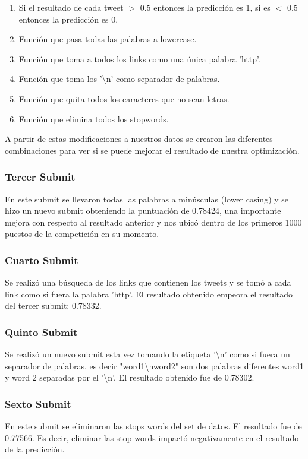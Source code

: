 \documentclass[12pt]{article}
\begin{document}
\begin{enumerate}
  \item Si el resultado de cada tweet $>$ 0.5 entonces la predicción es 1, si es $<$ 0.5 entonces la predicción es 0.
  \item Función que pasa todas las palabras a lowercase.
  \item Función que toma a todos los links como una única palabra 'http'.
  \item Función que toma los '\textbackslash n' como separador de palabras.
  \item Función que quita todos los caracteres que no sean letras.
  \item Función que elimina todos los stopwords.
\end{enumerate}
A partir de estas modificaciones a nuestros datos se crearon las diferentes combinaciones para ver si se puede mejorar el resultado de nuestra optimización.

\subsubsection{Tercer Submit}
En este submit se llevaron todas las palabras a minúsculas (lower casing) y se hizo un nuevo submit obteniendo la puntuación de 0.78424, una importante mejora con respecto al resultado anterior y nos ubicó dentro de los primeros 1000 puestos de la competición en su momento.


\subsubsection{Cuarto Submit}
Se realizó una búsqueda de los links que contienen los tweets y se tomó a cada link como si fuera la palabra 'http'. El resultado obtenido empeora el resultado del tercer submit: 0.78332.


\subsubsection{Quinto Submit}
Se realizó un nuevo submit esta vez tomando la etiqueta '\textbackslash n' como si fuera un separador de palabras, es decir "word1\textbackslash nword2" son dos palabras diferentes word1 y word 2 separadas por el '\textbackslash n'.
El resultado obtenido fue de 0.78302.


\subsubsection{Sexto Submit}
En este submit se eliminaron las stops words del set de datos.
El resultado fue de 0.77566. Es decir, eliminar las stop words impactó negativamente en el resultado de la predicción.
\end{document}
